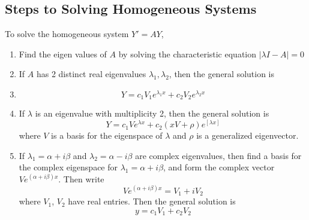 \documentclass[openany]{report}
\begin{document}
\subsection{Steps to Solving Homogeneous Systems}
To solve the homogeneous system $Y' = AY$,
\begin{enumerate}
    \item Find the eigen values of $A$ by solving the characteristic equation $|\lambda I - A| = 0$
    \item If $A$ has 2 distinct real eigenvalues $\lambda_1,\lambda_2$, then the general solution is
    \item \[Y = c_1V_1e^{\lambda_1x} + c_2V_2e^{\lambda_2x}\]
    \item If $\lambda$ is an eigenvalue with multiplicity 2, then the general solution is
    \[Y = c_1Ve^{\lambda x} + c_2(xV + \rho)e^[\lambda x]\]
    where $V$ is a basis for the eigenspace of $\lambda$ and $\rho$ is a generalized eigenvector.
    \item If $\lambda_1 = \alpha + i\beta$ and $\lambda_2 = \alpha - i\beta$ are complex eigenvalues, then find a basis for the complex eigenspace for $\lambda_1 = \alpha + i\beta$, and form the complex vector $Ve^{(\alpha + i\beta)x}$. Then write 
    \[Ve^{(\alpha + i\beta)x} = V_1 + iV_2\]
    where $V_1$, $V_2$ have real entries. Then the general solution is
    \[y = c_1V_1 + c_2V_2\]
\end{enumerate}
\end{document}
